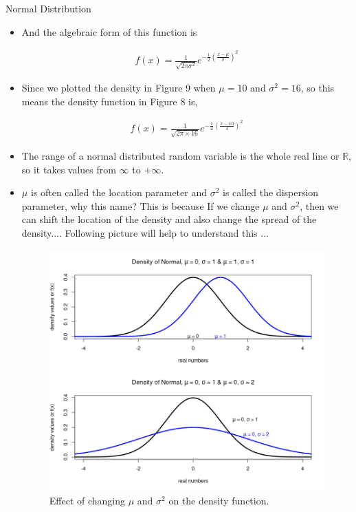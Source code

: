 \documentclass[8pt, usepdftitle = false]{beamer}
\begin{document}
\begin{frame}[allowframebreaks]{Normal Distribution}
\begin{itemize}
\item And the algebraic form of this function is

\begin{align*}
f\left(x\right)=\frac{1}{\sqrt{2 \pi \sigma^2}} e^{-\frac{1}{2}\left(\frac{x-\mu}{\sigma}\right)^2}
\end{align*}



\item Since we plotted the density in Figure 9 when $\mu = 10$ and $\sigma^2 = 16$, so this means the density function in Figure 8 is, 

\begin{align*}
f(x) = \frac{1}{\sqrt{2 \pi \times 16}} e^{-\frac{1}{2}\left(\frac{x-10}{4}\right)^2}
\end{align*} 


\item   The range of a normal distributed random variable is the whole real line or $\mathbb{R}$, so it takes values from $\infty$ to $+\infty$. 


\item $\mu$ is often called the \alert{location} parameter and $\sigma^2$ is called the \alert{dispersion} parameter, why this name?  This is because If we change $\mu$ and $\sigma^2$, then we can shift the location of the density and also change the spread of the density.... Following picture will help to understand this ...

\begin{figure}
\centering
\includegraphics[scale = .3]{Images/Normal_density_parameter_change.png}
\caption{Effect of changing $\mu$ and $\sigma^2$ on the density function.}
\end{figure}


\end{itemize}
\end{frame}
\end{document}

